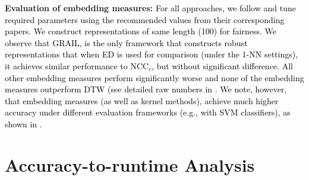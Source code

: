 \documentclass[11pt]{article}
\begin{document}
\newline \noindent \textbf{Evaluation of embedding measures: } \textcolor{black}{For all approaches, we follow \cite{paparrizos2019grail} and tune required parameters using the recommended  values  from  their  corresponding  papers. We construct representations of same length (100) for fairness. We observe that GRAIL, is the only framework that constructs robust representations that when ED is used for comparison (under the 1-NN settings), it achieves similar performance to NCC$_{c}$, but without significant difference. All other embedding measures perform significantly worse and none of the embedding measures outperform DTW (see detailed raw numbers in \cite{paparrizos2020debunking}. We note, however, that embedding measures (as well as kernel methods), achieve much higher accuracy under different evaluation frameworks (e.g., with SVM classifiers), as shown in \cite{paparrizos2019grail}.}

\section{Accuracy-to-runtime Analysis}
\label{john_sec:overall}
\end{document}
